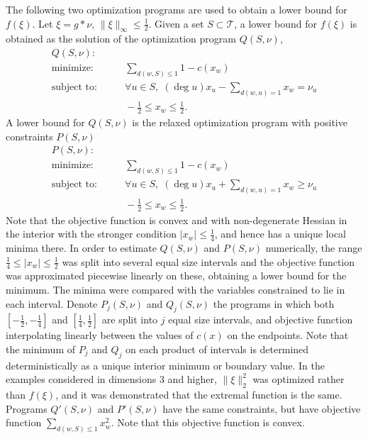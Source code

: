 \documentclass[a4paper, 12pt, notitlepage]{amsart}
\newcommand{\sT}{\mathscr{T}}
\theoremstyle{remark}
\begin{document}
The following two optimization programs are used to obtain a lower bound for $f(\xi)$. 
Let $\xi = g* \nu$, $\|\xi\|_\infty \leq \frac{1}{2}$.  Given a set $S \subset \sT$, a lower bound for $f(\xi)$ is obtained as the solution of the optimization program $Q(S, \nu)$,
\begin{align*}
 Q(S, \nu):&\\
 \text{minimize:}& \qquad \sum_{d(w, S) \leq 1} 1-c(x_w)\\
 \text{subject to:}& \qquad \forall u \in S,\; (\deg u) x_u - \sum_{d(w,u)=1} x_w = \nu_u\\
 & \qquad -\frac{1}{2} \leq x_w \leq \frac{1}{2}.
\end{align*}
A lower bound for $Q(S, \nu)$ is the relaxed optimization program with positive constraints $P(S, \nu)$
\begin{align*}
 P(S, \nu):&\\
 \text{minimize:}& \qquad \sum_{d(w, S) \leq 1} 1-c(x_w)\\
 \text{subject to:}& \qquad \forall u \in S,\; (\deg u) x_u + \sum_{d(w,u)=1} x_w \geq \nu_u\\
 & \qquad -\frac{1}{2} \leq x_w \leq \frac{1}{2}.
\end{align*}
Note that the objective function is convex and with non-degenerate Hessian in the interior with the stronger condition $|x_w|\leq \frac{1}{4}$, and hence has a unique local minima there.  In order to estimate $Q(S, \nu)$ and $P(S, \nu)$ numerically, the range $\frac{1}{4} \leq |x_w| \leq \frac{1}{2}$ was split into several equal size intervals and the objective function was approximated piecewise linearly on these, obtaining a lower bound for the minimum.  The minima were compared with the variables constrained to lie in each interval. Denote $P_j(S, \nu)$ and $Q_j(S, \nu)$ the programs in which both $\left[-\frac{1}{2}, -\frac{1}{4}\right]$ and $\left[\frac{1}{4}, \frac{1}{2}\right]$ are split into $j$ equal size intervals, and objective function interpolating linearly between the values of $c(x)$ on the endpoints.  Note that the minimum of $P_j$ and $Q_j$ on each product of intervals is determined deterministically as a unique interior minimum or boundary value.
In the examples considered in dimensions 3 and higher, $\|\xi\|_2^2$ was optimized rather than $f(\xi)$, and it was demonstrated that the extremal function is the same.  Programs $Q'(S, \nu)$ and $P'(S, \nu)$ have the same constraints, but have objective function
$\sum_{d(w, S) \leq 1} x_w^2.$  Note that this objective function is convex.
\end{document}
